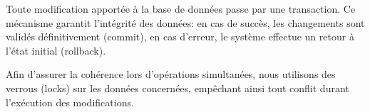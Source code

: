 
Toute modification apportée à la base de données passe par une transaction. Ce 
mécanisme garantit l'intégrité des données: en cas de succès, les changements 
sont validés définitivement (commit), en cas d'erreur, le système effectue un 
retour à l'état initial (rollback).

Afin d'assurer la cohérence lors d'opérations simultanées, nous utilisons des 
verrous (locks) sur les données concernées, empêchant ainsi tout conflit durant 
l'exécution des modifications.